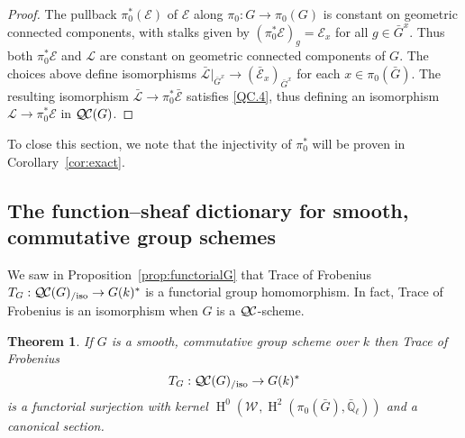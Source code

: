 \documentclass{amsart}
\theoremstyle{plain}
\newtheorem{theorem}{Theorem}[section]
\theoremstyle{definition}
\theoremstyle{remark}
\newcommand{\EE}{\mathbb{\bar Q}_\ell}
\newcommand{\Fq}{k}
\newcommand{\Weil}[1]{\mathcal{W}_{#1}}
\DeclareMathOperator{\Hh}{H}
\newcommand{\qcs}[1]{{\mathcal{#1}}}
\newcommand{\gqcs}[1]{{\mathcal{\bar #1}}}
\newcommand{\QC}{{\mathcal{Q\hskip-0.8pt C}}}
\newcommand{\QCiso}[1]{\QC(#1)_{/\text{iso}}}
\newcommand{\TrFrob}[1]{T_{#1}}
\newcommand{\bG}{\bar{G}}
\begin{document}
\begin{proof}
The pullback $\pi_0^*(\qcs{E})$ of $\qcs{E}$ along $\pi_0 : G \to \pi_0(G)$ is constant
on geometric connected components, with stalks given by
$(\pi_0^* \qcs{E})_g = \qcs{E}_{x}$ for all $g\in \bG^x$.  Thus both $\pi_0^*\qcs{E}$ and $\qcs{L}$
are constant on geometric connected components of $G$.
The choices above define isomorphisms
$\gqcs{L}\vert_{\bG^x} \to  (\gqcs{E}_{x})_{\bG^x}$ for each $x\in \pi_0(\bG)$.
The resulting isomorphism $\gqcs{L} \to \pi_0^* \gqcs{E}$ satisfies \ref{QC.4},
thus defining an isomorphism $\qcs{L} \to \pi_0^* \qcs{E}$ in $\QC(G)$.
\end{proof}

To close this section, we note that the injectivity of $\pi_0^*$ will be proven in Corollary~\ref{cor:exact}.

\subsection{The function--sheaf dictionary for smooth, commutative group schemes}
\label{sec:snake}

We saw in Proposition~\ref{prop:functorialG} that Trace of Frobenius
$\TrFrob{G} : \QCiso{G} \to G(\Fq)^*$ is a functorial group homomorphism.
In fact, Trace of Frobenius is an isomorphism when $G$ is a $\QC$-scheme.

\begin{theorem}\label{thm:snake}
  If $G$ is a smooth, commutative group scheme over
  $\Fq$ then Trace of Frobenius
  \[
  \TrFrob{G} : \QCiso{G} \to G(\Fq)^*
  \]
  is a functorial surjection with kernel $\Hh^0(\Weil{}, \Hh^2(\pi_0({\bar G}), \EE))$ and a canonical section.
\end{theorem}
\end{document}
